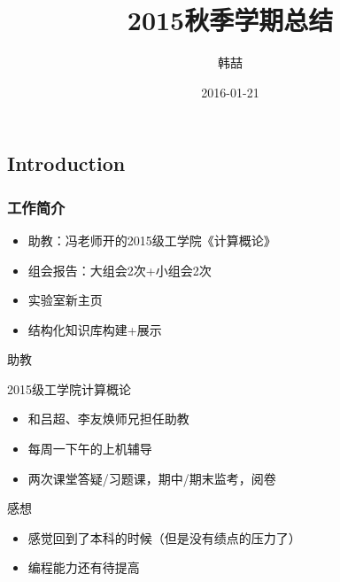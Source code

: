 \documentclass[color=usenames,dvipsnames]{beamer}
\title[2015 Summ]{2015秋季学期总结}
\author{韩喆}
\institute{PIE@WIP}
\date{2016-01-21}
\begin{document}
\begin{frame}
  \titlepage
\end{frame}


\begin{frame}


\section{Introduction}
\frametitle{工作简介}
\begin{itemize}
\item  助教：冯老师开的2015级工学院《计算概论》
\item \color{Green}
 组会报告：大组会2次+小组会2次
\item\color{RedOrange} 实验室新主页
\color{blue}
\item 结构化知识库构建+展示
\end{itemize}
\end{frame}


\begin{frame}{助教}
 \begin{block}{}
  2015级工学院计算概论
 \end{block}

 \begin{itemize}
  \item 和吕超、李友焕师兄担任助教
  \item 每周一下午的上机辅导
  \item 两次课堂答疑/习题课，期中/期末监考，阅卷
 \end{itemize}

 \pause
 感想
 \begin{itemize}
  \item 感觉回到了本科的时候（但是没有绩点的压力了）
  \item 编程能力还有待提高
 \end{itemize}
\end{frame}
\end{document}
